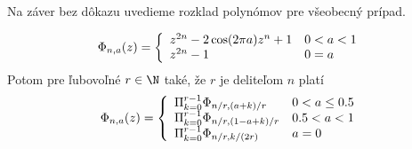 Na záver bez dôkazu uvedieme rozklad polynómov pre všeobecný prípad.
\begin{veta}
\begin{equation}
    \Phi_{n,a}(z) = \left\{
        \begin{array}{l l}
            z^{2n} - 2\cos(2\pi a) z^n +1 & 0<a<1 \\
            z^{2n} -1 & 0=a
        \end{array}
    \right.
\end{equation}
Potom pre ľubovoľné $r\in\N$ také, že $r$ je deliteľom $n$ platí
\begin{equation}
    \Phi_{n,a}(z) = \left\{
    \begin{array}{l l}
        \Pi_{k=0}^{r-1} \Phi_{n/r, (a+k)/r} & 0<a\le 0.5 \\
        \Pi_{k=0}^{r-1} \Phi_{n/r, (1-a+k)/r} & 0.5<a<1 \\
        \Pi_{k=0}^{r-1} \Phi_{n/r, k/(2r)} & a=0

    \end{array}
    \right.
\end{equation}
\end{veta}



